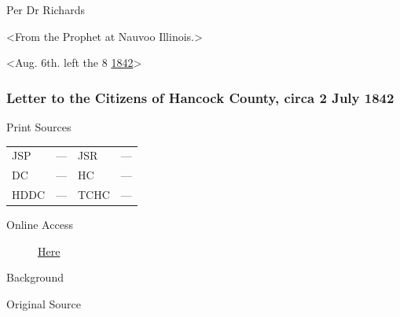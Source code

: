 				Per Dr Richards

				<From the Prophet at Nauvoo Illinois.>

				<Aug. 6th. left the 8 \uline{1842}>
				
		\subsubsection{Letter to the Citizens of Hancock County, circa 2 July 1842}
			\label{EMS-1842-JS-CIR-2-JUL-1842}
			
			\begin{description}
				\item[Print Sources]
			\end{description}

			\begin{tabular}{p{0.5in}p{1in}p{0.5in}p{1in}}
				JSP	 	& ---		& JSR 		& --- \\
				DC	 	& ---		& HC 		& --- \\
				HDDC 	& ---		& TCHC 		& --- \\
			\end{tabular}
			
			\begin{description}
				\item[Online Access] \href{https://www.josephsmithpapers.org/paper-summary/letter-to-the-citizens-of-hancock-county-circa-2-july-1842/1}{Here}
			\end{description}
			
			\begin{description}
				\item[Background]
			\end{description}
			
			
			\begin{description}
				\item[Original Source]
			\end{description}
			
			
